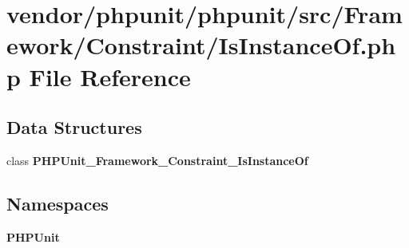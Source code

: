 \section{vendor/phpunit/phpunit/src/\+Framework/\+Constraint/\+Is\+Instance\+Of.php File Reference}
\label{_is_instance_of_8php}
\subsection*{Data Structures}
\begin{DoxyCompactItemize}
\item 
class {\bf P\+H\+P\+Unit\+\_\+\+Framework\+\_\+\+Constraint\+\_\+\+Is\+Instance\+Of}
\end{DoxyCompactItemize}
\subsection*{Namespaces}
\begin{DoxyCompactItemize}
\item 
 {\bf P\+H\+P\+Unit}
\end{DoxyCompactItemize}
